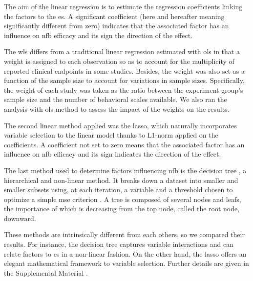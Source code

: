 The aim of the linear regression is to estimate the regression coefficients linking the factors
to the \gls{es}. A significant coefficient (here and hereafter meaning significantly different from zero) indicates
that the associated factor has an influence on \gls{nfb} efficacy and its sign the direction of the effect.

The \gls{wls} differs from a traditional linear regression estimated with \gls{ols} in that a weight is assigned 
to each observation so as to account for the multiplicity of reported clinical endpoints in some studies. Besides, the 
weight was also set as a function of the sample size to account for variations in sample sizes. Specifically, the weight of each study 
was taken as the ratio between the experiment group's sample size and the number of behavioral scales available.
We also ran the analysis with \gls{ols} method to assess the impact of the weights on the results. 

The second linear method applied was the \gls{lasso}, which naturally incorporates variable selection 
to the linear model thanks to L1-norm applied on the coefficients. A coefficient not set to zero means that 
the associated factor has an influence on \gls{nfb} efficacy and its sign indicates the direction of the effect.

The last method used to determine factors influencing \gls{nfb} is the decision tree \citep{Quinlan1986}, a hierarchical 
and non-linear method. It breaks down a dataset into smaller and smaller subsets using, at each iteration, a variable and 
a threshold chosen to optimize a simple \gls{mse} criterion \citep{James2013}. A tree is composed of several nodes and leafs, 
the importance of which is decreasing from the top node, called the root node, downward. 

These methods are intrinsically different from each others, so we compared their results. For instance, the decision
tree captures variable interactions and can relate factors to \gls{es} in a non-linear fashion. On the other hand, the
\gls{lasso} offers an elegant mathematical framework to variable selection. Further details are given in the Supplemental Material
\citep{Supplementalmaterial}.















